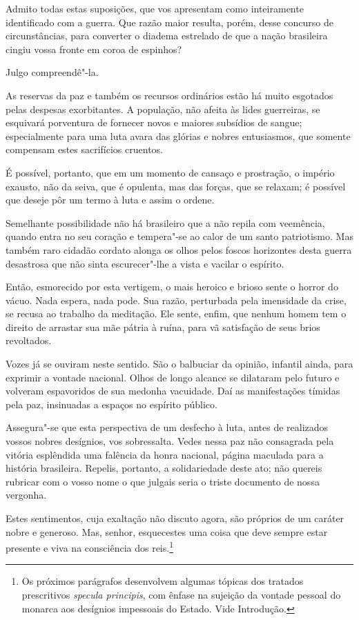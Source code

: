 Admito todas estas suposições, que vos apresentam como inteiramente
identificado com a guerra. Que razão maior resulta, porém, desse
concurso de circunstâncias, para converter o diadema estrelado de que a
nação brasileira cingiu vossa fronte em coroa de espinhos? 

Julgo compreendê"-la.

As reservas da paz e também os recursos ordinários estão há muito
esgotados pelas despesas exorbitantes. A população, não afeita às lides
guerreiras, se esquivará porventura de fornecer novos e maiores
subsídios de sangue; especialmente para uma luta avara das glórias e
nobres entusiasmos, que somente compensam estes sacrifícios cruentos. 

É possível, portanto, que em um momento de cansaço e prostração, o
império exausto, não da seiva, que é opulenta, mas das forças, que se
relaxam; é possível que deseje pôr um termo à luta e assim o ordene. 

Semelhante possibilidade não há brasileiro que a não repila com
veemência, quando entra no seu coração e tempera"-se ao calor de um
santo patriotismo. Mas também raro cidadão cordato alonga os olhos
pelos foscos horizontes desta guerra desastrosa que não sinta
escurecer"-lhe a vista e vacilar o espírito. 

Então, esmorecido por esta vertigem, o mais heroico e brioso sente o
horror do vácuo. Nada espera, nada pode. Sua razão, perturbada pela
imensidade da crise, se recusa ao trabalho da meditação. Ele sente,
enfim, que nenhum homem tem o direito de arrastar sua mãe pátria à
ruína, para vã satisfação de seus brios revoltados.

Vozes já se ouviram neste sentido. São o balbuciar da opinião, infantil
ainda, para exprimir a vontade nacional. Olhos de longo alcance se
dilataram pelo futuro e volveram espavoridos de sua medonha vacuidade.
Daí as manifestações tímidas pela paz, insinuadas a espaços no espírito público. 

Assegura"-se que esta perspectiva de um desfecho à luta, antes de
realizados vossos nobres desígnios, vos sobressalta. Vedes nessa paz
não consagrada pela vitória esplêndida uma falência da honra nacional,
página maculada para a história brasileira. Repelis, portanto, a
solidariedade deste ato; não quereis rubricar com o vosso nome o que
julgais seria o triste documento de nossa vergonha. 

\sectionitem

Estes sentimentos, cuja exaltação não discuto agora, são próprios de um
caráter nobre e generoso. Mas, senhor, esquecestes uma coisa que deve
sempre estar presente e viva na consciência dos reis.\footnote{ Os próximos parágrafos 
desenvolvem algumas tópicas dos tratados prescritivos \textit{specula principis}, com ênfase na 
sujeição da vontade pessoal do monarca aos desígnios impessoais do Estado. 
Vide Introdução.} 


